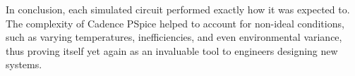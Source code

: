 In conclusion, each simulated circuit performed exactly how it was expected to.
The complexity of Cadence PSpice helped to account for non-ideal conditions,
such as varying temperatures, inefficiencies, and even environmental variance,
thus proving itself yet again as an invaluable tool to engineers designing new
systems.
